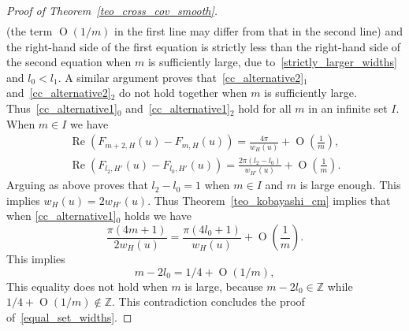 \documentclass[a4paper]{amsart}
\theoremstyle{definition}
\numberwithin{equation}{section}
\begin{document}
\begin{proof}[Proof of Theorem~\ref{teo_cross_cov_smooth}]
\begin{gather*}
\end{gather*}
(the term ${{\operatorname{O}}}(1/m)$ in the first line may differ from that in the second line) and the right-hand side of the first equation is strictly less than the right-hand side of the second equation when $m$ is sufficiently large, due to~\eqref{strictly_larger_widths} and $l_0<l_1$.  A similar argument proves that~\eqref{cc_alternative2}$_1$ and~\eqref{cc_alternative2}$_2$ do not hold together when $m$ is sufficiently large.
Thus~\eqref{cc_alternative1}$_0$ and~\eqref{cc_alternative1}$_2$ hold for all $m$ in an infinite set $I$. When $m\in I$ we have
\begin{gather*}
  {\operatorname{Re}}\left(F_{m+2,H}(u)-F_{m,H}(u)\right)=\frac{4\pi}{{{{w}}}_H(u)}+{{\operatorname{O}}}\left(\frac1{m}\right),\\
 {\operatorname{Re}}\left(F_{l_2,H'}(u)-F_{l_0,H'}(u)\right)=\frac{2\pi(l_2-l_0)}{{{{w}}}_{H'}(u)}+{{\operatorname{O}}}\left(\frac1{m}\right).
\end{gather*}
Arguing as above proves that $l_2-l_0=1$ when $m\in I$ and $m$ is large enough. This implies ${{{w}}}_H(u)=2{{{w}}}_{H'}(u)$. Thus Theorem~\ref{teo_kobayashi_cm} implies that when \eqref{cc_alternative1}$_0$ holds we have 
 \begin{equation*}
  \frac{\pi (4m+1)}{2{{{w}}}_H(u)}=\frac{\pi (4l_0+1)}{{{{w}}}_H(u)}+{{\operatorname{O}}}\left(\frac1{m}\right).
 \end{equation*}
This implies
\[
m-2l_0=1/4+{{\operatorname{O}}}(1/m), 
\]
This equality does not hold when $m$ is large, because $m-2l_0\in\mathbb{Z}$ while $1/4+{{\operatorname{O}}}(1/m)\notin\mathbb{Z}$. This contradiction concludes the proof of~\eqref{equal_set_widths}.


\end{proof}
\end{document}
